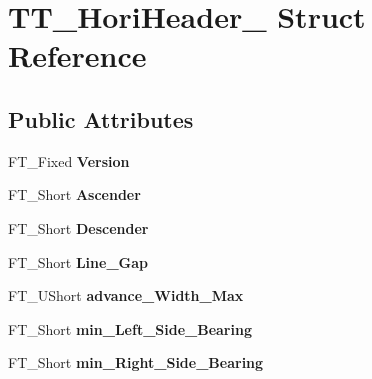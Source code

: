 \hypertarget{struct_t_t___hori_header__}{}\section{T\+T\+\_\+\+Hori\+Header\+\_\+ Struct Reference}
\label{struct_t_t___hori_header__}
\subsection*{Public Attributes}
\begin{DoxyCompactItemize}
\item 
F\+T\+\_\+\+Fixed {\bfseries Version}\hypertarget{struct_t_t___hori_header___a2d0967448b63db392e35b566196fef97}{}\label{struct_t_t___hori_header___a2d0967448b63db392e35b566196fef97}

\item 
F\+T\+\_\+\+Short {\bfseries Ascender}\hypertarget{struct_t_t___hori_header___a6f987c89428c93854dab06e506134249}{}\label{struct_t_t___hori_header___a6f987c89428c93854dab06e506134249}

\item 
F\+T\+\_\+\+Short {\bfseries Descender}\hypertarget{struct_t_t___hori_header___ad5be55a98dfaa079a2aaa462034a1512}{}\label{struct_t_t___hori_header___ad5be55a98dfaa079a2aaa462034a1512}

\item 
F\+T\+\_\+\+Short {\bfseries Line\+\_\+\+Gap}\hypertarget{struct_t_t___hori_header___a4165055ed05e42a2e5eed805bfe3fd7d}{}\label{struct_t_t___hori_header___a4165055ed05e42a2e5eed805bfe3fd7d}

\item 
F\+T\+\_\+\+U\+Short {\bfseries advance\+\_\+\+Width\+\_\+\+Max}\hypertarget{struct_t_t___hori_header___a1ddad7e4c5e6fed50c073745961814da}{}\label{struct_t_t___hori_header___a1ddad7e4c5e6fed50c073745961814da}

\item 
F\+T\+\_\+\+Short {\bfseries min\+\_\+\+Left\+\_\+\+Side\+\_\+\+Bearing}\hypertarget{struct_t_t___hori_header___a0e2e2bf8ca0e18b610c4eae0a647fded}{}\label{struct_t_t___hori_header___a0e2e2bf8ca0e18b610c4eae0a647fded}

\item 
F\+T\+\_\+\+Short {\bfseries min\+\_\+\+Right\+\_\+\+Side\+\_\+\+Bearing}\hypertarget{struct_t_t___hori_header___a64144cdd595e8e8de119b78539bf2fa7}{}\label{struct_t_t___hori_header___a64144cdd595e8e8de119b78539bf2fa7}


\end{DoxyCompactItemize}
